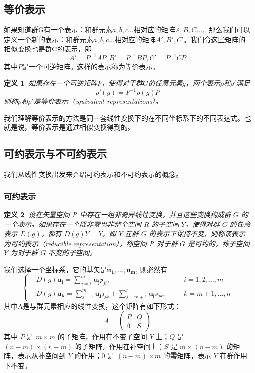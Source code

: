 \documentclass{ctexart}%
\newtheorem{definition}{定义}
\begin{document}
\subsection{等价表示}
如果知道群G有一个表示：和群元素$a,b,c...$相对应的矩阵$A,B,C...$，那么我们可以定义一个新的表示：和群元素$a,b,c...$相对应的矩阵$A',B',C'$。我们令这些矩阵的相似变换也是群G的表示，即
\[A' = P^{-1}AP, B' = P^{-1}BP, C' = P^{-1}CP\]
其中$P$是一个可逆矩阵。这样的表示称为等价表示。
\begin{definition}
    如果存在一个可逆矩阵$P$，使得对于群$G$的任意元素$g$，两个表示$\rho$和$\rho'$满足
    \[
    \rho'(g) = P^{-1} \rho(g) P
    \]
    则称$\rho$和$\rho'$是等价表示（equivalent representations）。
\end{definition}
我们理解等价表示的方法是同一套线性变换下的在不同坐标系下的不同表达式。也就是说，等价表示是通过相似变换得到的。
\subsection{可约表示与不可约表示}
我们从线性变换出发来介绍可约表示和不可约表示的概念。
\subsubsection{可约表示}
\begin{definition}
    设在矢量空间 $R$ 中存在一组非奇异线性变换，并且这些变换构成群 $G$ 的一个表示。如果存在一个既非零也非整个空间 $R$ 的子空间 $Y$，使得对群 $G$ 的任意表示 $D(g)$，都有 $D(g)Y = Y$，即 $Y$ 在群 $G$ 的表示下保持不变，则称该表示为可约表示（reducible representation），称空间 $R$ 对于群 $G$ 是可约的，称子空间 $Y$ 为对于群 $G$ 不变的子空间。
\end{definition}
我们选择一个坐标系，它的基矢是$\mathbf{u_1},...,\mathbf{u_m}$, 则必然有
\[
\left\{
\begin{aligned}
    &D(g)\mathbf{u_i} = \sum_{j=1}^{m} \mathbf{u_j} p_{ji}, &&\quad i = 1,2,\ldots,m\\
    &D(g)\mathbf{u_k} = \sum_{j=1}^{m}  \mathbf{u_j}q_{jk}+\sum_{j=m+1}^{n} \mathbf{u_j}s_{jk}, &&\quad k = m+1,\ldots,n
\end{aligned}
\right.
\]
其中A是与群元素相应的线性变换，这个矩阵有如下形式：
\[
A = \left(
\begin{array}{cc}
    P & Q \\
    0 & S
\end{array}
\right)
\]
其中 $P$ 是 $m \times m$ 的子矩阵，作用在不变子空间 $Y$ 上；$Q$ 是 $(n-m) \times (n-m)$ 的子矩阵，作用在补空间上；$S$ 是 $m \times (n-m)$ 的矩阵，表示从补空间到 $Y$ 的作用；$0$ 是 $(n-m) \times m$ 的零矩阵，表示 $Y$ 在群作用下不变。
\end{document}
